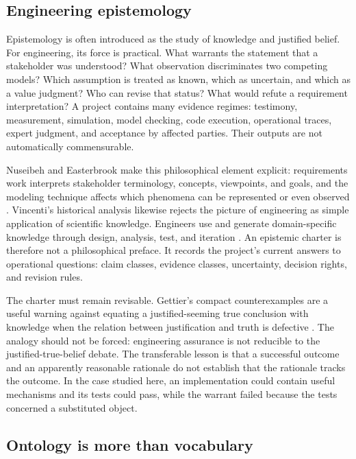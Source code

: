 \documentclass[10pt,a4paper]{article}
\begin{document}
\subsection{Engineering epistemology}

Epistemology is often introduced as the study of knowledge and justified belief. For engineering, its force is practical. What warrants the statement that a stakeholder was understood? What observation discriminates two competing models? Which assumption is treated as known, which as uncertain, and which as a value judgment? Who can revise that status? What would refute a requirement interpretation? A project contains many evidence regimes: testimony, measurement, simulation, model checking, code execution, operational traces, expert judgment, and acceptance by affected parties. Their outputs are not automatically commensurable.

Nuseibeh and Easterbrook make this philosophical element explicit: requirements work interprets stakeholder terminology, concepts, viewpoints, and goals, and the modeling technique affects which phenomena can be represented or even observed \cite{nuseibeh2000}. Vincenti's historical analysis likewise rejects the picture of engineering as simple application of scientific knowledge. Engineers use and generate domain-specific knowledge through design, analysis, test, and iteration \cite{vincenti1990}. An epistemic charter is therefore not a philosophical preface. It records the project's current answers to operational questions: claim classes, evidence classes, uncertainty, decision rights, and revision rules.

The charter must remain revisable. Gettier's compact counterexamples are a useful warning against equating a justified-seeming true conclusion with knowledge when the relation between justification and truth is defective \cite{gettier1963}. The analogy should not be forced: engineering assurance is not reducible to the justified-true-belief debate. The transferable lesson is that a successful outcome and an apparently reasonable rationale do not establish that the rationale tracks the outcome. In the case studied here, an implementation could contain useful mechanisms and its tests could pass, while the warrant failed because the tests concerned a substituted object.

\subsection{Ontology is more than vocabulary}
\end{document}
